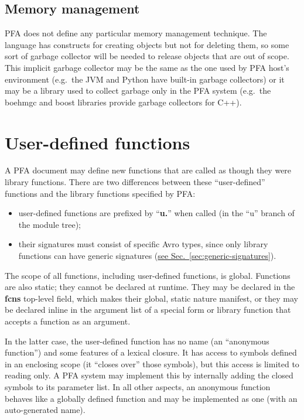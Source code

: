 \documentclass{article}
\newcommand{\PFAc}{\ttfamily\bfseries}
\theoremstyle{definition}
\begin{document}
\subsection{Memory management}

PFA does not define any particular memory management technique.  The language has constructs for creating objects but not for deleting them, so some sort of garbage collector will be needed to release objects that are out of scope.  This implicit garbage collector may be the same as the one used by PFA host's environment (e.g.\ the JVM and Python have built-in garbage collectors) or it may be a library used to collect garbage only in the PFA system (e.g.\ the boehmgc and boost libraries provide garbage collectors for C++).

\pagebreak

\hypertarget{hsec:user-defined-fcns}{}
\section{User-defined functions}
\label{sec:user-defined-fcns}

A PFA document may define new functions that are called as though they were library functions.  There are two differences between these ``user-defined'' functions and the library functions specified by PFA:
\begin{itemize}
\item user-defined functions are prefixed by ``{\PFAc u.}'' when called (in the ``u'' branch of the module tree);
\item their signatures must consist of specific Avro types, since only library functions can have generic signatures (\hyperlink{hsec:generic-signatures}{see Sec.~\ref{sec:generic-signatures}}).
\end{itemize}

The scope of all functions, including user-defined functions, is global.  Functions are also static; they cannot be declared at runtime.  They may be declared in the {\PFAc fcns} top-level field, which makes their global, static nature manifest, or they may be declared inline in the argument list of a special form or library function that accepts a function as an argument.

In the latter case, the user-defined function has no name (an ``anonymous function'') and some features of a lexical closure.  It has access to symbols defined in an enclosing scope (it ``closes over'' those symbols), but this access is limited to reading only.  A PFA system may implement this by internally adding the closed symbols to its parameter list.  In all other aspects, an anonymous function behaves like a globally defined function and may be implemented as one (with an auto-generated name).
\end{document}
